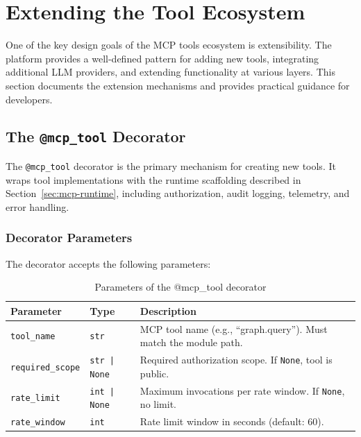 
\section{Extending the Tool Ecosystem}
\label{sec:tool-extension}

One of the key design goals of the MCP tools ecosystem is extensibility. The platform provides a well-defined pattern for adding new tools, integrating additional LLM providers, and extending functionality at various layers. This section documents the extension mechanisms and provides practical guidance for developers.

\subsection{The \texttt{@mcp\_tool} Decorator}
\label{subsec:mcp-tool-decorator-usage}

The \texttt{@mcp\_tool} decorator is the primary mechanism for creating new tools. It wraps tool implementations with the runtime scaffolding described in Section~\ref{sec:mcp-runtime}, including authorization, audit logging, telemetry, and error handling.

\subsubsection{Decorator Parameters}

The decorator accepts the following parameters:

\begin{table}[htbp]
    \centering
    \caption{Parameters of the @mcp\_tool decorator}
    \label{tab:mcp-tool-params}
    \begin{tabularx}{\textwidth}{llX}
        \toprule
        \textbf{Parameter} & \textbf{Type} & \textbf{Description} \\
        \midrule
        \texttt{tool\_name} & \texttt{str} & MCP tool name (e.g., ``graph.query''). Must match the module path. \\
        \texttt{required\_scope} & \texttt{str | None} & Required authorization scope. If \texttt{None}, tool is public. \\
        \texttt{rate\_limit} & \texttt{int | None} & Maximum invocations per rate window. If \texttt{None}, no limit. \\
        \texttt{rate\_window} & \texttt{int} & Rate limit window in seconds (default: 60). \\
        \bottomrule
    \end{tabularx}
\end{table}

